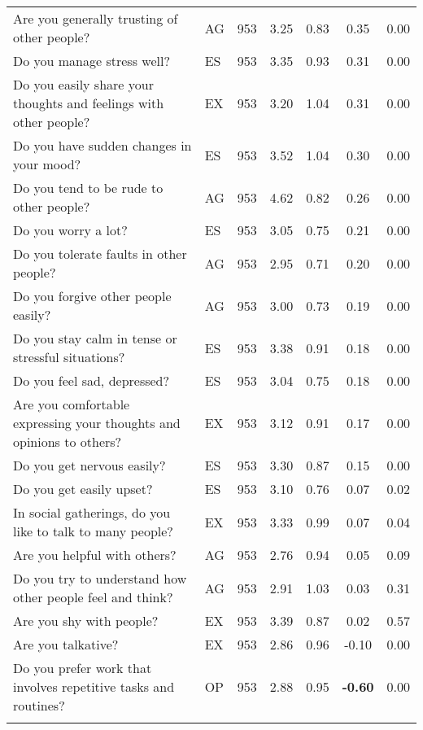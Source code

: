 \begin{table}[htbp]
{\begin{tabular}{llccccc}
    Are you generally trusting of other people? & AG    & 953   & 3.25  & 0.83  & 0.35  & 0.00 \\
    Do you manage stress well? & ES    & 953   & 3.35  & 0.93  & 0.31  & 0.00 \\
    Do you easily share your thoughts and feelings with other people? & EX    & 953   & 3.20  & 1.04  & 0.31  & 0.00 \\
    Do you have sudden changes in your mood? & ES    & 953   & 3.52  & 1.04  & 0.30  & 0.00 \\
    Do you tend to be rude to other people? & AG    & 953   & 4.62  & 0.82  & 0.26  & 0.00 \\
    Do you worry a lot? & ES    & 953   & 3.05  & 0.75  & 0.21  & 0.00 \\
    Do you tolerate faults in other people? & AG    & 953   & 2.95  & 0.71  & 0.20  & 0.00 \\
    Do you forgive other people easily? & AG    & 953   & 3.00  & 0.73  & 0.19  & 0.00 \\
    Do you stay calm in tense or stressful situations? & ES    & 953   & 3.38  & 0.91  & 0.18  & 0.00 \\
    Do you feel sad, depressed? & ES    & 953   & 3.04  & 0.75  & 0.18  & 0.00 \\
    Are you comfortable expressing your thoughts and opinions to others? & EX    & 953   & 3.12  & 0.91  & 0.17  & 0.00 \\
    Do you get nervous easily? & ES    & 953   & 3.30  & 0.87  & 0.15  & 0.00 \\
    Do you get easily upset? & ES    & 953   & 3.10  & 0.76  & 0.07  & 0.02 \\
    In social gatherings, do you like to talk to many people? & EX    & 953   & 3.33  & 0.99  & 0.07  & 0.04 \\
    Are you helpful with others? & AG    & 953   & 2.76  & 0.94  & 0.05  & 0.09 \\
    Do you try to understand how other people feel and think? & AG    & 953   & 2.91  & 1.03  & 0.03  & 0.31 \\
    Are you shy with people? & EX    & 953   & 3.39  & 0.87  & 0.02  & 0.57 \\
    Are you talkative? & EX    & 953   & 2.86  & 0.96  & -0.10 & 0.00 \\
    Do you prefer work that involves repetitive tasks and routines? & OP    & 953   & 2.88  & 0.95  & \textbf{-0.60} & 0.00 \\
    \bottomrule
	\Tablenote{7}{Most contributive \textbf{variables} are used to interpret factor: threshold at 0.6.} \\
    \end{tabular}%
	}
  \label{tab:factor2}%
\end{table}%
